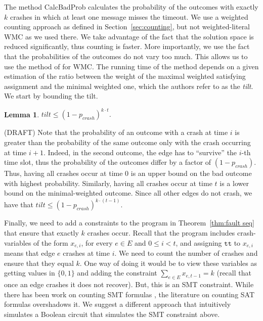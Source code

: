 \documentclass[11pt,eepic]{article}
\newcommand{\set}[1]{\{ #1  \}}
\renewcommand{\tt}{\texttt{tt}}
\newtheorem{lemma}[theorem]{Lemma}
\def\eod{\vrule height 6pt width 5pt depth 0pt}
\newenvironment{proof}{\noindent {\bf Proof:} \hspace{.677em}}
	                      {\hspace*{\fill}{\eod}}
\begin{document}
		The method {\sc CalcBadProb} calculates the probability of the outcomes with exactly $k$ crashes in which at least one message misses the timeout. We use a weighted counting approach as defined in Section~\ref{sec:counting}, but not weighted-literal WMC as we used there. We take advantage of the fact that the solution space is reduced significantly, thus counting is faster. More importantly, we use the fact that the probabilities of the outcomes do not vary too much. This allows us to use the method of \cite{..} for WMC. The running time of the method depends on a given estimation of the ratio between the weight of the maximal weighted satisfying assignment and the minimal weighted one, which the authors refer to as the {\em tilt}. We start by bounding the tilt.
		\begin{lemma}
		\label{lem:tilt}
		$tilt \leq (1-p_{crash})^{k \cdot t}$.
		\end{lemma}
		\begin{proof}
		(DRAFT) Note that the probability of an outcome with a crash at time $i$ is greater than the probability of the same outcome only with the crash occurring at time $i+1$. Indeed, in the second outcome, the edge has to ``survive'' the $i$-th time slot, thus the probability of the outcomes differ by a factor of $(1-p_{crash})$. Thus, having all crashes occur at time $0$ is an upper bound on the bad outcome with highest probability. Similarly, having all crashes occur at time $t$ is a lower bound on the minimal-weighted outcome. Since all other edges do not crash, we have that $tilt \leq (1-p_{crash})^{k \cdot (t-1)}$.
		\end{proof}

		Finally, we need to add a constraints to the program in Theorem~\ref{thm:fault seq} that ensure that exactly $k$ crashes occur. Recall that the program includes crash-variables of the form $x_{e,i}$, for every $e \in E$ and $0 \leq i <t$, and assigning $\tt$ to $x_{e,i}$ means that edge $e$ crashes at time $i$. We need to count the number of crashes and ensure that they equal $k$. One way of doing it would be to view these variables as getting values in $\set{0,1}$ and adding the constraint $\sum_{e \in E} x_{e,t-1} = k$ (recall that once an edge crashes it does not recover). But, this is an SMT constraint. While there has been work on counting SMT formulas \cite{CDM15}, the literature on counting SAT formulas overshadows it. We suggest a different approach that intuitively simulates a Boolean circuit that simulates the SMT constraint above.
\end{document}
